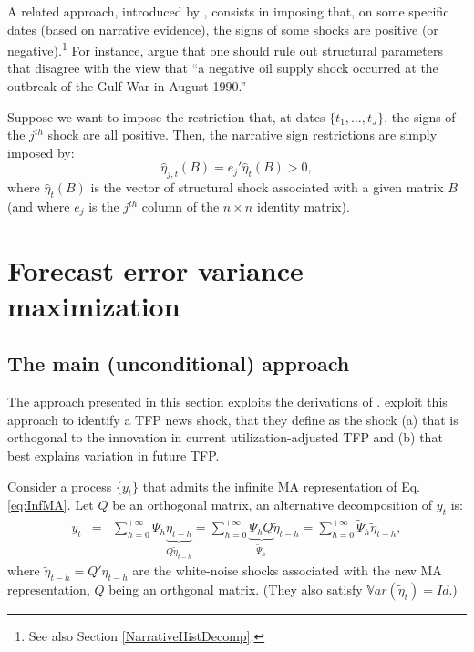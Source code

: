 \documentclass[
  12pt,
]{book}
\theoremstyle{definition}
\theoremstyle{definition}
\theoremstyle{definition}
\theoremstyle{definition}
\theoremstyle{remark}
\begin{document}
A related approach, introduced by \citet{AntolinDiaz_RubioRamirez_2018}, consists in imposing that, on some specific dates (based on narrative evidence), the signs of some shocks are positive (or negative).\footnote{See also Section \ref{NarrativeHistDecomp}.} For instance, \citet{AntolinDiaz_RubioRamirez_2018} argue that one should rule out structural parameters that disagree with the view that ``a negative oil supply shock occurred at the outbreak of the Gulf War in August 1990.''

Suppose we want to impose the restriction that, at dates \(\{t_1,\dots,t_J\}\), the signs of the \(j^{th}\) shock are all positive. Then, the narrative sign restrictions are simply imposed by:
\[
\hat{\eta}_{j,t}(B) = e_j'\hat\eta_{t}(B) > 0,
\]
where \(\hat\eta_{t}(B)\) is the vector of structural shock associated with a given matrix \(B\) (and where \(e_j\) is the \(j^{th}\) column of the \(n \times n\) identity matrix).

\hypertarget{forecast-error-variance-maximization}{%
\chapter{Forecast error variance maximization}\label{forecast-error-variance-maximization}}

\hypertarget{the-main-unconditional-approach}{%
\section{The main (unconditional) approach}\label{the-main-unconditional-approach}}

The approach presented in this section exploits the derivations of \citet{Uhlig_2004}. \citet{BARSKY2011273} exploit this approach to identify a TFP news shock, that they define as the shock (a) that is orthogonal to the innovation in current utilization-adjusted TFP and (b) that best explains variation in future TFP.

Consider a process \(\{y_t\}\) that admits the infinite MA representation of Eq. \eqref{eq:InfMA}. Let \(Q\) be an orthogonal matrix, an alternative decomposition of \(y_t\) is:
\begin{eqnarray}
y_t&=&\sum_{h=0}^{+\infty}\Psi_h\underbrace{\eta_{t-h}}_{Q\tilde \eta_{t-h}} = \sum_{h=0}^{+\infty}\underbrace{\Psi_hQ}_{\tilde\Psi_h}\tilde
\eta_{t-h} = \sum_{h=0}^{+\infty}\tilde\Psi_h\tilde \eta_{t-h},
\end{eqnarray}
where \(\tilde \eta_{t-h}=Q'\eta_{t-h}\) are the white-noise shocks associated with the new MA representation, \(Q\) being an orthgonal matrix. (They also satisfy \(\mathbb{V}ar(\tilde\eta_t)=Id\).)
\end{document}
